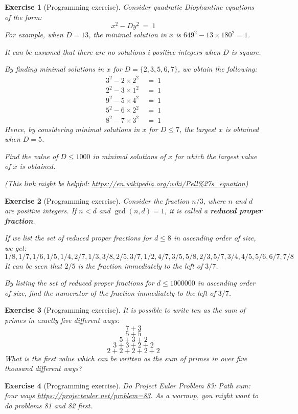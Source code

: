 \documentclass[11pt]{amsart}
\theoremstyle{theorem}
\newtheorem{exercise}{Exercise}
\begin{document}
\begin{exercise}[Programming exercise]
Consider quadratic Diophantine equations of the form:
\[
x^2-Dy^2 \ = \ 1
\]
For example, when $D=13$, the minimal solution in $x$ is $649^2-13\times 180^2=1$.

It can be assumed that there are no solutions i positive integers when $D$ is square.

By finding minimal solutions in $x$ for $D=\{2,3,5,6,7\}$, we obtain the following:
\begin{align*}
3^2-2\times 2^2 \ &= \ 1 \\
2^2-3\times 1^2 \ &= \ 1 \\
9^2-5\times 4^2 \ &= \ 1 \\
5^2-6\times 2^2 \ &= \ 1 \\
8^2-7\times 3^2 \ &= \ 1
\end{align*}
Hence, by considering minimal solutions in $x$ for $D\leq 7$, the largest $x$ is obtained when $D=5$.

Find the value of $D\leq 1000$ in minimal solutions of $x$ for which the largest value of $x$ is obtained.

(This link might be helpful: \url{https://en.wikipedia.org/wiki/Pell\%27s_equation})
\end{exercise}


\begin{exercise}[Programming exercise]
Consider the fraction $n/3$, where $n$ and $d$ are positive integers. If $n<d$ and $\gcd(n,d)=1$, it is called a \textbf{reduced proper fraction}.

If we list the set of reduced proper fractions for $d\leq 8$ in ascending order of size, we get:
\[
1/8, 1/7, 1/6,1/5,1/4,2/7,1/3,3/8,2/5,3/7,1/2,4/7,3/5, 5/8,2/3,5/7,3/4,4/5,5/6,6/7,7/8
\]
It can be seen that $2/5$ is the fraction immediately to the left of $3/7$.

By listing the set of reduced proper fractions for $d\leq 1000000$ in ascending order of size, find the numerator of the fraction immediately to the left of $3/7$.
\end{exercise}


\begin{exercise}[Programming exercise]
It is possible to write ten as the sum of primes in exactly five different ways:
\[
7+3
\]
\[
5+5
\]
\[
5+3+2
\]
\[
3+3+2+2
\]
\[
2+2+2+2+2
\]
What is the first value which can be written as the sum of primes in over five thousand different ways?
\end{exercise}

\begin{exercise}[Programming exercise]
Do Project Euler Problem 83: Path sum: four ways \url{https://projecteuler.net/problem=83}. As a warmup, you might want to do problems 81 and 82 first.
\end{exercise}
\end{document}
